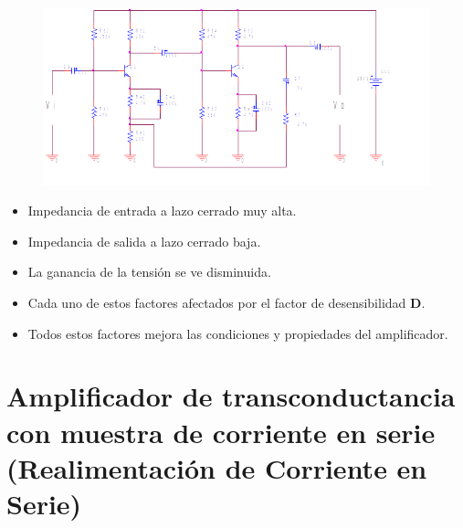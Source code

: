 \newpage

\begin{figure}[h]
	\includegraphics[width=0.8\linewidth]{./img/esq1.png}
	\centering
	\label{fig:esq_amp1}
\end{figure}

\begin{itemize}
	\item Impedancia de entrada a lazo cerrado muy alta.
	\item Impedancia de salida a lazo cerrado baja.
	\item La ganancia de la tensión se ve disminuida.
	\item Cada uno de estos factores afectados por el factor de desensibilidad \textbf{D}.
	\item Todos estos factores mejora las condiciones y propiedades del amplificador.
\end{itemize}

\section{Amplificador de transconductancia con muestra de corriente en serie (Realimentación de Corriente en Serie)}

